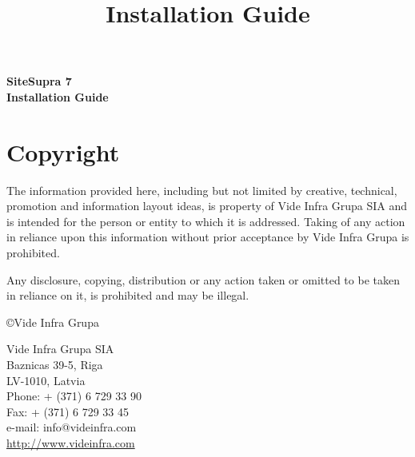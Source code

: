 \documentclass[12pt]{article}
\newcommand{\vigClientBranding}{0}
\newcommand{\vigClientName}{Client Name}
\newcommand{\vigClientNameShort}{client}
\newcommand{\vigProjectName}{SiteSupra 7}
\newcommand{\vigProjectNameShort}{supra7}
\newcommand{\vigAttn}{Person Name}
\newcommand{\vigDocumentRevision}{1}
\begin{document}
\title{Installation Guide}	

\begin{titlepage}


\textbf{\huge \vigProjectName}\\
\textbf{\huge Installation Guide}\\


%

\end{titlepage}

\setlength{\parskip}{0em}
\tableofcontents

\newpage

\normalsize
\setlength{\parskip}{0.5em}

\section*{Copyright}

The information provided here, including but not limited by creative, technical, promotion and information layout ideas, is property of Vide Infra Grupa SIA and is intended for the person or entity to which it is addressed. Taking of any action in reliance upon this information without prior acceptance by Vide Infra Grupa is prohibited. 

Any disclosure, copying, distribution or any action taken or omitted to be taken in reliance on it, is prohibited and may be illegal.

\copyright Vide Infra Grupa%

\vspace{2em}

Vide Infra Grupa SIA\\
Baznicas 39-5, Riga\\
LV-1010, Latvia\\
Phone: + (371) 6 729 33 90\\
Fax:  + (371) 6 729 33 45\\
e-mail: info@videinfra.com\\
\url{http://www.videinfra.com}
\end{document}
